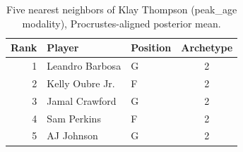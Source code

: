 \begin{table}[htbp]
  \centering\small
  \begin{tabular}{rllc}
    \toprule
    Rank & Player & Position & Archetype \\
    \midrule
    1 & Leandro Barbosa & G & 2 \\
    2 & Kelly Oubre Jr. & F & 2 \\
    3 & Jamal Crawford & G & 2 \\
    4 & Sam Perkins & F & 2 \\
    5 & AJ Johnson & G & 2 \\
    \bottomrule
  \end{tabular}
  \caption{Five nearest neighbors of Klay Thompson (peak_age modality), Procrustes-aligned posterior mean.}
  \label{tab:Klay_Thompson_neighbors_peak_age}
\end{table}

